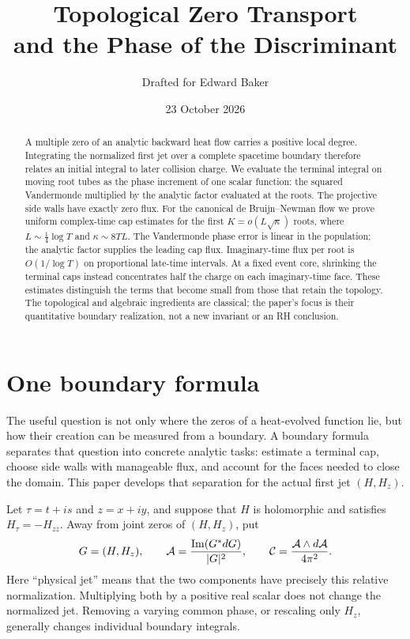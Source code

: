 \documentclass[11pt,letterpaper]{article}
\title{Topological Zero Transport\\and the Phase of the Discriminant}
\author{Drafted for Edward Baker}
\date{23 October 2026}
\numberwithin{equation}{section}
\theoremstyle{remark}\newtheorem{remark}[theorem]{Remark}
\newcommand{\im}{\operatorname{Im}}\newcommand{\re}{\operatorname{Re}}
\newcommand{\CC}{\mathcal C}\newcommand{\DD}{\mathscr D}
\begin{document}
\maketitle
\begin{abstract}
A multiple zero of an analytic backward heat flow carries a positive
local degree. Integrating the normalized first jet over a complete
spacetime boundary therefore relates an initial integral to later
collision charge. We evaluate the terminal integral on moving root
tubes as the phase increment of one scalar function: the squared
Vandermonde multiplied by the analytic factor evaluated at the roots.
The projective side walls have exactly zero flux. For the canonical
de Bruijn--Newman flow we prove uniform complex-time cap estimates for
the first $K=o(L\sqrt\kappa)$ roots, where $L\sim\frac14\log T$ and
$\kappa\sim8TL$. The Vandermonde phase error is linear in the population;
the analytic factor supplies the leading cap flux. Imaginary-time flux
per root is $O(1/\log T)$ on proportional late-time intervals. At a fixed
event core, shrinking the terminal caps instead concentrates half the
charge on each imaginary-time face. These estimates distinguish the
terms that become small from those that retain the topology. The
topological and algebraic ingredients are classical; the paper's focus
is their quantitative boundary realization, not a new invariant or an
RH conclusion.
\end{abstract}

\section{One boundary formula}
\label{sec:intro}

The useful question is not only where the zeros of a heat-evolved
function lie, but how their creation can be measured from a boundary.
A boundary formula separates that question into concrete analytic
tasks: estimate a terminal cap, choose side walls with manageable
flux, and account for the faces needed to close the domain. This paper
develops that separation for the actual first jet $(H,H_z)$.

Let $\tau=t+is$ and $z=x+iy$, and suppose that $H$ is holomorphic and
satisfies $H_\tau=-H_{zz}$. Away from joint zeros of $(H,H_z)$, put
\begin{equation}
 G=(H,H_z),\qquad
 \Aconn=\frac{\im(G^*dG)}{|G|^2},\qquad
 \CC=\frac{\Aconn\wedge d\Aconn}{4\pi^2}.
 \label{eq:forms}
\end{equation}
Here ``physical jet'' means that the two components have precisely this
relative normalization. Multiplying both by a positive real scalar
does not change the normalized jet. Removing a varying common phase,
or rescaling only $H_z$, generally changes individual boundary integrals.
\end{document}
